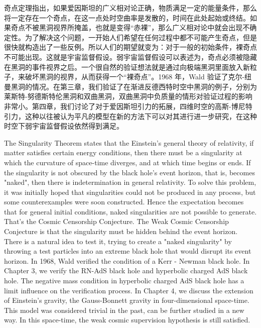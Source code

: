 \begin{cabstract}
    奇点定理指出，如果爱因斯坦的广义相对论正确，物质满足一定的能量条件，那么将一定存在一个奇点，在这一点处时空曲率是发散的，时间在此处起始或终结。如果奇点不被黑洞视界所掩盖，也就是变得“赤裸”，那么广义相对论中就会出现不确定性。为了解决这个问题，一开始人们希望在任何过程中都不可能产生奇点，但是很快就构造出了一些反例。所以人们的期望就变为：对于一般的初始条件，裸奇点不可能出现。这就是宇宙监督假设。弱宇宙监督假设可以表述为，奇点必须被隐藏在黑洞的事件视界之后。一个很自然的验证想法就是通过向极端黑洞里面放入新粒子，来破坏黑洞的视界，从而获得一个“裸奇点”。1968 年，Wald 验证了克尔-纽曼黑洞的情况。在第三章，我们验证了在渐进反德西特时空中黑洞的例子，分别为莱斯特-努德斯特伦黑洞和双曲黑洞，双曲黑洞中负质量的情形对验证过程的影响非常小。第四章，我们讨论了对于爱因斯坦引力的拓展，四维时空的高斯-博尼特引力，这种以往被认为平凡的模型在新的方法下可以对其进行进一步研究，在这种时空下弱宇宙监督假设依然得到满足。
\end{cabstract}

\begin{eabstract}
    The Singularity Theorem states that the Einstein's general theory of relativity, if matter satisfies certain energy conditions, then there must be a singularity at which the curvature of space-time diverges, and at which time begins or ends. If the singularity is not obscured by the black hole's event horizon, that is, becomes "naked", then there is indetermination in general relativity. To solve this problem, it was initially hoped that singularities could not be produced in any process, but some counterexamples were soon constructed. Hence the expectation becomes that for general initial conditions, naked singularities are not possible to generate. That's the Cosmic Censorship Conjecture. The Weak Cosmic Censorship Conjecture is that the singularity must be hidden behind the event horizon. There is a natural idea to test it, trying to create a "naked singularity" by throwing a test particles into an extreme black hole that would disrupt its event horizon. In 1968, Wald verified the condition of a Kerr - Newman black hole. In Chapter 3, we verify the RN-AdS black hole and hyperbolic charged AdS black hole. The negative mass condition in hyperbolic charged AdS black hole has a limit influence on the verification process. In Chapter 4, we discuss the extension of Einstein's gravity, the Gauss-Bonnett gravity in four-dimensional space-time. This model was considered trivial in the past, can be further studied in a new way. In this space-time, the weak cosmic supervision hypothesis is still satisfied.

\end{eabstract}

\makecover
\tableofcontents
